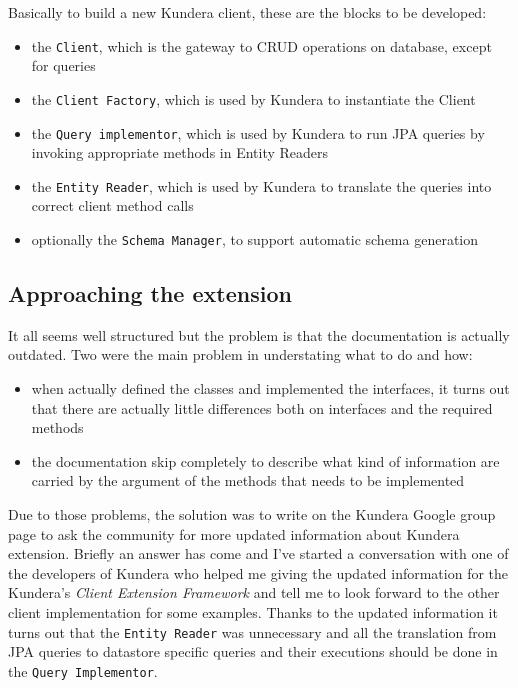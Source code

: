 \newparagraph Basically to build a new Kundera client, these are the blocks to be developed:
\begin{itemize}
\item the \texttt{Client}, which is the gateway to CRUD operations on database, except for queries
\item the \texttt{Client Factory}, which is used by Kundera to instantiate the Client
\item the \texttt{Query implementor}, which is used by Kundera to run JPA queries by invoking appropriate methods in Entity Readers
\item the \texttt{Entity Reader}, which is used by Kundera to translate the queries into correct client
method calls
\item optionally the \texttt{Schema Manager}, to support automatic schema generation
\end{itemize}

\subsection{Approaching the extension}
It all seems well structured but the problem is that the documentation is actually outdated. 
\noindent Two were the main problem in understating what to do and how:
\begin{itemize}
\item when actually defined the classes and implemented the interfaces, it turns out that there are actually little differences both on interfaces and the required methods 
\item the documentation skip completely to describe what kind of information are carried by the argument of the methods that needs to be implemented
\end{itemize} 

\noindent Due to those problems, the solution was to write on the Kundera Google group page to ask the community for more updated information about Kundera extension.
Briefly an answer has come and I've started a conversation with one of the developers of Kundera who helped me giving the updated information for the Kundera's \textit{Client Extension Framework} and tell me to look forward to the other client implementation for some examples. 
Thanks to the updated information it turns out that the \texttt{Entity Reader} was unnecessary and all the translation from JPA queries to datastore specific queries and their executions should be done in the \texttt{Query Implementor}.  

